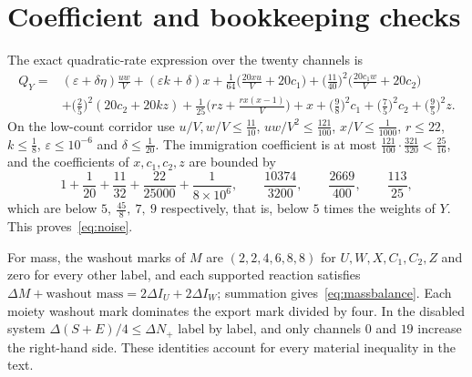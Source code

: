 \documentclass[11pt,a4paper]{article}
\theoremstyle{plain}
\theoremstyle{definition}
\theoremstyle{remark}
\newcommand{\eps}{\varepsilon}
\begin{document}
\section{Coefficient and bookkeeping checks}\label{app:coeff}
The exact quadratic-rate expression over the twenty channels is
\begin{align*}
 Q_Y={}&(\eps+\delta\eta)\frac{uw}V+(\eps k+\delta)x
 +\frac1{64}\Big(\frac{20xu}V+20c_1\Big)+\Big(\frac{11}{40}\Big)^2\Big(\frac{20c_1w}V+20c_2\Big)\\
 &+\Big(\frac25\Big)^2(20c_2+20kz)+\frac1{25}\Big(rz+\frac{rx(x-1)}V\Big)
 +x+\Big(\frac98\Big)^2c_1+\Big(\frac75\Big)^2c_2+\Big(\frac95\Big)^2z .
\end{align*}
On the low-count corridor use $u/V,w/V\le\frac{11}{10}$, $uw/V^2\le\frac{121}{100}$, $x/V\le\frac1{1000}$, $r\le22$, $k\le\frac18$, $\eps\le10^{-6}$ and $\delta\le\frac1{20}$. The immigration coefficient is at most $\frac{121}{100}\cdot\frac{321}{320}<\frac{25}{16}$, and the coefficients of $x,c_1,c_2,z$ are bounded by
\[
 1+\frac1{20}+\frac{11}{32}+\frac{22}{25000}+\frac1{8\times10^6},\qquad\frac{10374}{3200},\qquad\frac{2669}{400},\qquad\frac{113}{25},
\]
which are below $5,\ \frac{45}8,\ 7,\ 9$ respectively, that is, below $5$ times the weights of $Y$. This proves~\eqref{eq:noise}.

For mass, the washout marks of $M$ are $(2,2,4,6,8,8)$ for $U,W,X,C_1,C_2,Z$ and zero for every other label, and each supported reaction satisfies $\Delta M+\text{washout mass}=2\Delta I_U+2\Delta I_W$; summation gives~\eqref{eq:massbalance}. Each moiety washout mark dominates the export mark divided by four. In the disabled system $\Delta(S+E)/4\le\Delta N_+$ label by label, and only channels $0$ and $19$ increase the right-hand side. These identities account for every material inequality in the text.
\end{document}
